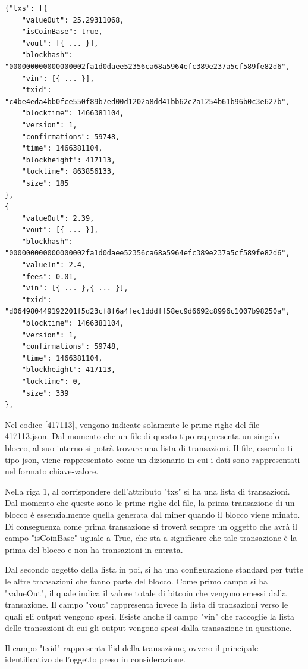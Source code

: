 \begin{lstlisting}[basicstyle=\tiny, caption = \textit{Prime righe del file 417113.json}, label=417113]
{"txs": [{
	"valueOut": 25.29311068,
	"isCoinBase": true,
	"vout": [{ ... }],	
	"blockhash": "000000000000000002fa1d0daee52356ca68a5964efc389e237a5cf589fe82d6",
	"vin": [{ ... }],
	"txid": "c4be4eda4bb0fce550f89b7ed00d1202a8dd41bb62c2a1254b61b96b0c3e627b",
	"blocktime": 1466381104,
	"version": 1,
	"confirmations": 59748,
	"time": 1466381104,
	"blockheight": 417113,
	"locktime": 863856133,
	"size": 185
},
{
	"valueOut": 2.39,	
	"vout": [{ ... }],	
	"blockhash": "000000000000000002fa1d0daee52356ca68a5964efc389e237a5cf589fe82d6",
	"valueIn": 2.4,
	"fees": 0.01,	
	"vin": [{ ... },{ ... }],
	"txid": "d064980449192201f5d23cf8f6a4fec1dddff58ec9d6692c8996c1007b98250a",	
	"blocktime": 1466381104,
	"version": 1,
	"confirmations": 59748,
	"time": 1466381104,
	"blockheight": 417113,
	"locktime": 0,
	"size": 339
},
\end{lstlisting}

Nel codice \ref{417113}, vengono indicate solamente le prime righe del file 417113.json. Dal momento che un file di questo tipo rappresenta un singolo blocco, al suo interno si potrà trovare una lista di transazioni. Il file, essendo ti tipo json, viene rappresentato come un dizionario in cui i dati sono rappresentati nel formato chiave-valore.

Nella riga 1, al corrispondere dell'attributo "txs" si ha una lista di transazioni. Dal momento che queste sono le prime righe del file, la prima transazione di un blocco è essenzialmente quella generata dal miner quando il blocco viene minato. Di conseguenza come prima transazione si troverà sempre un oggetto che avrà il campo "isCoinBase" uguale a True, che sta a significare che tale transazione è la prima del blocco e non ha transazioni in entrata.

Dal secondo oggetto della lista in poi, si ha una configurazione standard per tutte le altre transazioni che fanno parte del blocco. Come primo campo si ha "valueOut", il quale indica il valore totale di bitcoin che vengono emessi dalla transazione. Il campo "vout" rappresenta invece la lista di transazioni verso le quali gli output vengono spesi. Esiste anche il campo "vin" che raccoglie la lista delle transazioni di cui gli output vengono spesi dalla transazione in questione. 

Il campo "txid" rappresenta l'id della transazione, ovvero il principale identificativo dell'oggetto preso in considerazione. 

